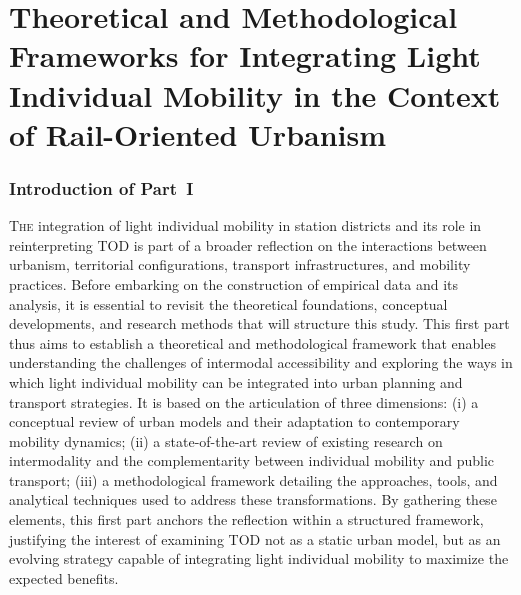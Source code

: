 \renewcommand{\thefigure}{\thechapter.\arabic{figure}} %
\renewcommand{\thetable}{\thechapter.\arabic{table}}
\setcounter{figure}{0}
\setcounter{table}{0}

\part{Theoretical and Methodological Frameworks for Integrating Light Individual Mobility in the Context of Rail-Oriented Urbanism
    \label{part1:titre}
    }

\cleardoublepage
\section*{Introduction of Part~I
    \label{part1:introduction}
    }

\lettrine[lines=3, findent=8pt, nindent=0pt]{ T}{he} integration of light individual mobility in station districts and its role in reinterpreting \acrfull{TOD} is part of a broader reflection on the interactions between urbanism, territorial configurations, transport infrastructures, and mobility practices. Before embarking on the construction of empirical data and its analysis, it is essential to revisit the theoretical foundations, conceptual developments, and research methods that will structure this study. This first part thus aims to establish a theoretical and methodological framework that enables understanding the challenges of intermodal accessibility and exploring the ways in which light individual mobility can be integrated into urban planning and transport strategies. It is based on the articulation of three dimensions: (i) a conceptual review of urban models and their adaptation to contemporary mobility dynamics; (ii) a state-of-the-art review of existing research on intermodality and the complementarity between individual mobility and public transport; (iii) a methodological framework detailing the approaches, tools, and analytical techniques used to address these transformations. By gathering these elements, this first part anchors the reflection within a structured framework, justifying the interest of examining \acrshort{TOD} not as a static urban model, but as an evolving strategy capable of integrating light individual mobility to maximize the expected benefits.%


